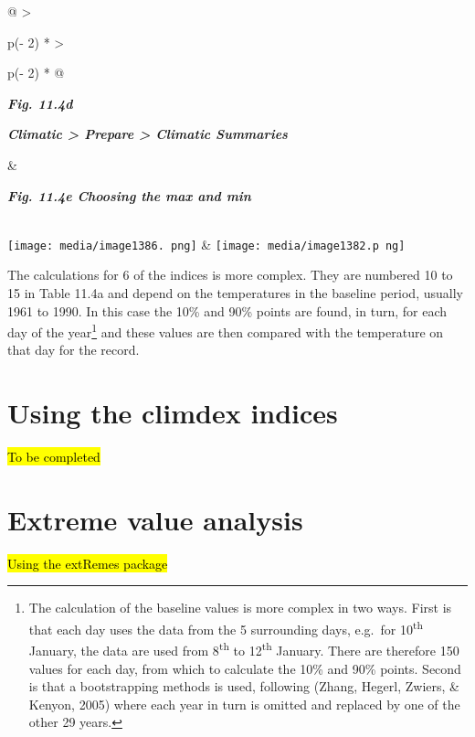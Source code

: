 \documentclass[
  letterpaper,
  DIV=11,
  numbers=noendperiod]{scrreprt}
\begin{document}
\begin{longtable}[]{@{}
  >{\raggedright\arraybackslash}p{(\columnwidth - 2\tabcolsep) * }
  >{\raggedright\arraybackslash}p{(\columnwidth - 2\tabcolsep) * }@{}}
\toprule\noalign{}
\begin{minipage}[b]{\linewidth}\raggedright
\textbf{\emph{Fig. 11.4d}}

\textbf{\emph{Climatic \textgreater{} Prepare \textgreater{} Climatic
Summaries}}
\end{minipage} & \begin{minipage}[b]{\linewidth}\raggedright
\textbf{\emph{Fig. 11.4e Choosing the max and min}}
\end{minipage} \\
\midrule\noalign{}
\endhead
\bottomrule\noalign{}
\endlastfoot
\texttt{[image: media/image1386. png]}
&
\texttt{[image: media/image1382.p ng]} \\
\end{longtable}

The calculations for 6 of the indices is more complex. They are numbered
10 to 15 in Table 11.4a and depend on the temperatures in the baseline
period, usually 1961 to 1990. In this case the 10\% and 90\% points are
found, in turn, for each day of the year\footnote{The calculation of the
  baseline values is more complex in two ways. First is that each day
  uses the data from the 5 surrounding days, e.g.~for
  10\textsuperscript{th} January, the data are used from
  8\textsuperscript{th} to 12\textsuperscript{th} January. There are
  therefore 150 values for each day, from which to calculate the 10\%
  and 90\% points. Second is that a bootstrapping methods is used,
  following (Zhang, Hegerl, Zwiers, \& Kenyon, 2005) where each year in
  turn is omitted and replaced by one of the other 29 years.} and these
values are then compared with the temperature on that day for the
record.

\section{Using the climdex indices}\label{using-the-climdex-indices}

\hl{To be completed}

\section{Extreme value analysis}\label{extreme-value-analysis}

\hl{Using the extRemes package}
\end{document}
